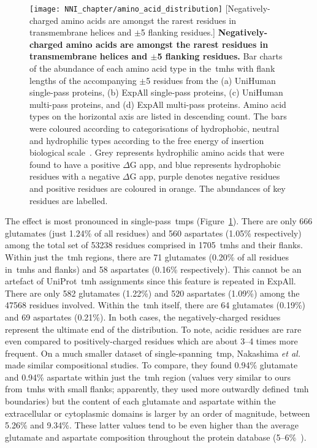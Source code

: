 \begin{figure}[!ht]
\centering
\texttt{[image: NNI\_chapter/amino\_acid\_distribution]}
[Negatively\--charged amino acids are amongst the rarest residues in transmembrane helices and $\pm$5 flanking residues.] {\textbf{Negatively\--charged amino acids are amongst the rarest residues in transmembrane helices and $\pm$5 flanking residues.} Bar charts of the abundance of each amino acid type in the~\gls{tmh}s with flank lengths of the accompanying $\pm$5 residues from the (a) UniHuman single\--pass proteins, (b) ExpAll single\--pass proteins, (c) UniHuman multi\--pass proteins, and (d) ExpAll multi\--pass proteins.
Amino acid types on the horizontal axis are listed in descending count.
The bars were coloured according to categorisations of hydrophobic, neutral and hydrophilic types according to the free energy of insertion biological scale~\cite{Hessa2005}.
Grey represents hydrophilic amino acids that were found to have a positive $\Delta$G app, and blue represents hydrophobic residues with a negative $\Delta$G app, purple denotes negative residues and positive residues are coloured in orange.
The abundances of key residues are labelled.}

\label{fig:amino_acid_distribution}
\end{figure}

The effect is most pronounced in single\--pass~\gls{tmp}s (Figure~\ref{fig:amino_acid_distribution}).
There are only 666 glutamates (just 1.24\% of all residues) and 560 aspartates (1.05\% respectively) among the total set of 53238 residues comprised in 1705~\gls{tmh}s and their flanks.
Within just the~\gls{tmh} regions, there are 71 glutamates (0.20\% of all residues in~\gls{tmh}s and flanks) and 58 aspartates (0.16\% respectively).
This cannot be an artefact of UniProt~\gls{tmh} assignments since this feature is repeated in ExpAll.
There are only 582 glutamates (1.22\%) and 520 aspartates (1.09\%) among the 47568 residues involved.
Within the~\gls{tmh} itself, there are 64 glutamates (0.19\%) and 69 aspartates (0.21\%).
In both cases, the negatively\--charged residues represent the ultimate end of the distribution.
To note, acidic residues are rare even compared to positively\--charged residues which are about 3--4 times more frequent.
On a much smaller dataset of single-spanning~\gls{tmp}, Nakashima \textit{et al.}
~\cite{Nakashima1992} made similar compositional studies.
To compare, they found 0.94\% glutamate and 0.94\% aspartate within just the~\gls{tmh} region (values very similar to ours from~\gls{tmh}s with small flanks; apparently, they used more outwardly defined~\gls{tmh} boundaries) but the content of each glutamate and aspartate within the extracellular or cytoplasmic domains is larger by an order of magnitude, between 5.26\% and 9.34\%.
These latter values tend to be even higher than the average glutamate and aspartate composition throughout the protein database (5--6\%~\cite{Nakashima1992}).

